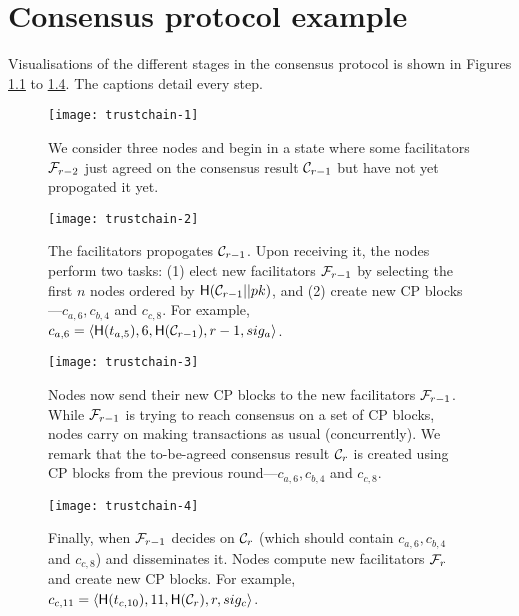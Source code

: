 \chapter{Consensus protocol example}
\label{app:consensus-example}

Visualisations of the different stages in the consensus protocol is shown in Figures \ref{fig:trustchain-1} to \ref{fig:trustchain-4}.
The captions detail every step.

\begin{figure}[htb]
    \texttt{[image: trustchain-1]}
    \centering
    \caption{We consider three nodes and begin in a state where some facilitators $\mathcal{F}_{r-2}$ just agreed on the consensus result $\mathcal{C}_{r-1}$ but have not yet propogated it yet.}
    \label{fig:trustchain-1}
\end{figure}

\begin{figure}[htb]
    \texttt{[image: trustchain-2]}
    \centering
    \caption{The facilitators propogates $\mathcal{C}_{r-1}$. Upon receiving it, the nodes perform two tasks:
    (1) elect new facilitators $\mathcal{F}_{r-1}$ by selecting the first $n$ nodes ordered by $\textsf{H}(\mathcal{C}_{r-1} || pk)$,
    and (2) create new CP blocks---$c_{a, 6}, c_{b, 4}$ and $c_{c, 8}$.
    For example, $c_{a, 6} = \langle \textsf{H}(t_{a, 5}), 6, \textsf{H}(\mathcal{C}_{r-1}), r-1, sig_a\rangle$.}
    \label{fig:trustchain-2}
\end{figure}

\begin{figure}
    \texttt{[image: trustchain-3]}
    \centering
    \caption{Nodes now send their new CP blocks to the new facilitators $\mathcal{F}_{r-1}$.
    While $\mathcal{F}_{r-1}$ is trying to reach consensus on a set of CP blocks,
    nodes carry on making transactions as usual (concurrently).
    We remark that the to-be-agreed consensus result $\mathcal{C}_r$ is created using CP blocks from the previous round---$c_{a, 6}, c_{b, 4}$ and $c_{c, 8}$.
    }
    \label{fig:trustchain-3}
\end{figure}

\begin{figure}
    \texttt{[image: trustchain-4]}
    \centering
    \caption{Finally, when $\mathcal{F}_{r-1}$ decides on $\mathcal{C}_r$ (which should contain $c_{a, 6}, c_{b, 4}$ and $c_{c, 8}$) and disseminates it.
    Nodes compute new facilitators $\mathcal{F}_{r}$ and create new CP blocks.
    For example, $c_{c, 11} = \langle \textsf{H}(t_{c, 10}), 11, \textsf{H}(\mathcal{C}_r), r, sig_c \rangle$.}
    \label{fig:trustchain-4}
\end{figure}